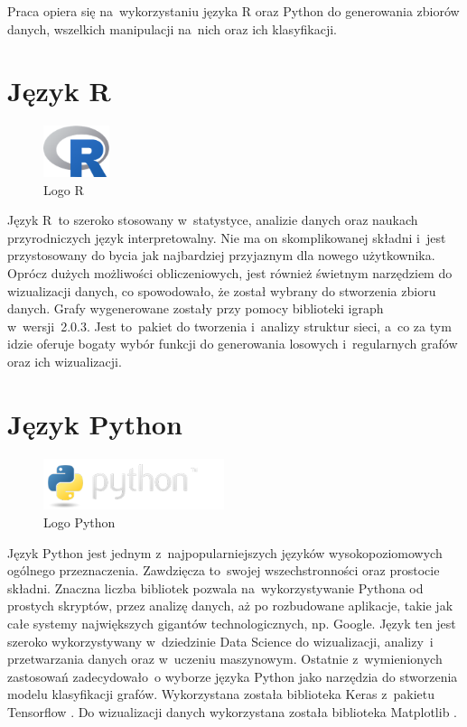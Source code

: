 Praca opiera się na~wykorzystaniu języka R \cite{strR} oraz Python \cite{strPython} do generowania zbiorów danych,
wszelkich manipulacji na~nich oraz ich klasyfikacji.

\section{Język R}

\begin{figure}[ht]
	\centering
	\includegraphics[height=1.5cm]{resources/technologies/images/logo_r.png}
	\caption{Logo R \cite{strR}}
	\label{Fig:tech-r}
\end{figure}
\FloatBarrier

Język R~to szeroko stosowany w~statystyce, analizie danych oraz naukach przyrodniczych język interpretowalny.
Nie ma on skomplikowanej składni i~jest przystosowany do bycia jak najbardziej przyjaznym dla nowego użytkownika.
Oprócz dużych możliwości obliczeniowych, jest również świetnym narzędziem do wizualizacji danych,
co spowodowało, że został wybrany do stworzenia zbioru danych.
Grafy wygenerowane zostały przy pomocy biblioteki igraph \cite{strIgraph} w~wersji~2.0.3.
Jest to~pakiet do tworzenia i~analizy struktur sieci, a~co za tym idzie oferuje bogaty wybór funkcji do
generowania losowych i~regularnych grafów oraz ich wizualizacji.

\clearpage

\section{Język Python}

\begin{figure}[ht]
	\centering
	\includegraphics[height=1.5cm]{resources/technologies/images/logo_python.png}
	\caption{Logo Python \cite{strPython}}
	\label{Fig:tech-python}
\end{figure}
\FloatBarrier

Język Python jest jednym z~najpopularniejszych języków wysokopoziomowych ogólnego przeznaczenia.
Zawdzięcza to~swojej wszechstronności oraz prostocie składni.
Znaczna liczba bibliotek pozwala na~wykorzystywanie Pythona od
prostych skryptów, przez analizę danych, aż po rozbudowane aplikacje, takie jak całe
systemy największych gigantów technologicznych, np. Google. Język ten jest szeroko
wykorzystywany w~dziedzinie Data Science do wizualizacji, analizy~i przetwarzania danych oraz w~uczeniu maszynowym.
Ostatnie z~wymienionych zastosowań zadecydowało~o wyborze języka Python jako narzędzia do stworzenia modelu klasyfikacji grafów.
Wykorzystana została biblioteka Keras z~pakietu Tensorflow \cite{strTensorFlow}.
Do wizualizacji danych wykorzystana została biblioteka Matplotlib \cite{strMatplotlib}.

